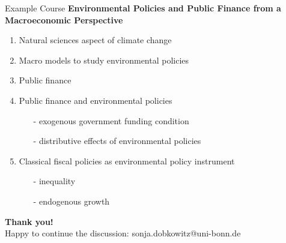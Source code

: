 \begin{frame}{Example Course}
	\vspace{-2mm}
\alert{\textbf{Environmental Policies and Public Finance from a Macroeconomic Perspective}}
	\pause
\begin{enumerate}[<+->]
	\item Natural sciences aspect of climate change \footnotesize{\citep{Hassler2016EnvironmentalMacroeconomics, Hsiang2018AnScience}} \normalsize
	\vspace{1mm}
	\item Macro models to study environmental policies \\ \footnotesize{\citep{Acemoglu2012TheChange, Golosov2014OptimalEquilibrium, Acemoglu2016TransitionTechnology, Fried2018ClimateAnalysis, Barrage2019OptimalPolicy}} \normalsize
		\vspace{1mm}
	\item Public finance \footnotesize{\citep{ Domeij2004OnTaxes, Conesa2009TaxingAll, Heathcote2017OptimalFramework}} \normalsize
		\vspace{1mm}
	\item Public finance and environmental policies
	\begin{itemize}
		\item[-] exogenous government funding condition \\ \footnotesize{\citep{LansBovenberg1994EnvironmentalTaxation, Goulder1995EnvironmentalGuide, Barrage2019OptimalPolicy}}
		\item[-] distributive effects of environmental policies \\ \footnotesize{\citep{Fried2018TheGenerations, Goulder2019IncomeGroups, Kotlikoff2021MakingWin}}
	\end{itemize}
	\vspace{1mm}
\item Classical fiscal policies as environmental policy instrument
\begin{itemize}
		\item[-] inequality \footnotesize{\citep{Jacobs2019RedistributionCurves, Dobkowitz2022, Douenne2022OptimalHouseholds}} \normalsize
		\item[-] endogenous growth \footnotesize{\citep{Dobkowitz2022b}}
\end{itemize}
\end{enumerate}
\end{frame}


\begin{frame}
	\hypertarget{end}{}
	\huge \textbf{Thank you!} \\
	\vspace{5mm}
	\normalsize
	{Happy to continue the discussion: \alert{sonja.dobkowitz@uni-bonn.de}}
\end{frame}


